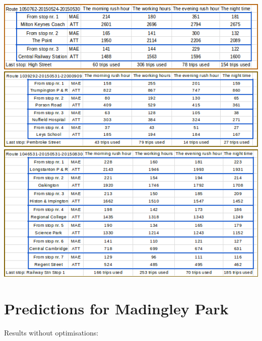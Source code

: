 \documentclass[12pt,a4paper,oneside,openright]{report}
\begin{document}
\includegraphics[width=\textwidth]{figs/table_of_1050762.png}
\includegraphics[width=\textwidth]{figs/table_of_1039292.png}
\includegraphics[width=\textwidth]{figs/table_of_1046531.png}

\newpage

\section{Predictions for Madingley Park}

Results without optimisations: \\
\end{document}

